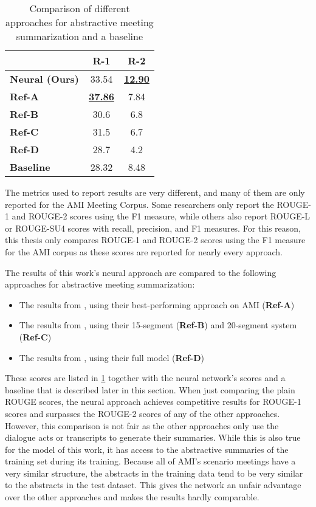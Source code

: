 \begin{table}[]
\centering
\begin{tabular}{@{}lcc@{}}
\toprule
                       & \textbf{R-1}     & \textbf{R-2}     \\ \midrule
\textbf{Neural (Ours)} & 33.54                & \underline{\textbf{12.90}} \\
\textbf{Ref-A}         & \underline{\textbf{37.86}} & 7.84                 \\
\textbf{Ref-B}         & 30.6                 & 6.8                  \\
\textbf{Ref-C}         & 31.5                 & 6.7                  \\
\textbf{Ref-D}         & 28.7                 & 4.2                  \\
\textbf{Baseline}      & 28.32                & 8.48                 \\ \bottomrule
\end{tabular}
\caption{Comparison of different approaches for abstractive meeting summarization and a baseline}
\label{tab:comparison}
\end{table}

The metrics used to report results are very different, and many of them are only reported for the AMI Meeting Corpus.
Some researchers only report the ROUGE-1 and ROUGE-2 scores using the F1 measure, while others also report ROUGE-L or ROUGE-SU4 scores with recall, precision, and F1 measures.
For this reason, this thesis only compares ROUGE-1 and ROUGE-2 scores using the F1 measure for the AMI corpus as these scores are reported for nearly every approach.

The results of this work's neural approach are compared to the following approaches for abstractive meeting summarization:
\begin{itemize}
\item The results from \cite{shang-etal-2018-unsupervised}, using their best-performing approach on AMI (\textbf{Ref-A})
\item The results from \cite{oya-etal-2014-template}, using their 15-segment (\textbf{Ref-B}) and 20-segment system (\textbf{Ref-C})
\item The results from \cite{mehdad-etal-2013-abstractive}, using their full model (\textbf{Ref-D})
\end{itemize}

These scores are listed in \cref{tab:comparison} together with the neural network's scores and a baseline that is described later in this section.
When just comparing the plain ROUGE scores, the neural approach achieves competitive results for ROUGE-1 scores and surpasses the ROUGE-2 scores of any of the other approaches.
However, this comparison is not fair as the other approaches only use the dialogue acts or transcripts to generate their summaries.
While this is also true for the model of this work, it has access to the abstractive summaries of the training set during its training.
Because all of AMI's scenario meetings have a very similar structure, the abstracts in the training data tend to be very similar to the abstracts in the test dataset.
This gives the network an unfair advantage over the other approaches and makes the results hardly comparable.

